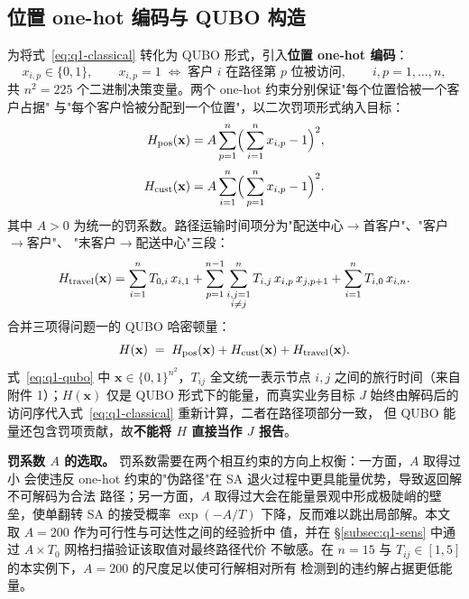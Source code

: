 \documentclass[UTF8,12pt,a4paper]{ctexart}
\begin{document}
\subsection{位置 one-hot 编码与 QUBO 构造}
\label{subsec:q1-qubo}

为将式~\eqref{eq:q1-classical} 转化为 QUBO 形式，引入\textbf{位置 one-hot 编码}：
\begin{equation}
x_{i,p}\in\{0,1\},\qquad x_{i,p}=1 \;\Longleftrightarrow\; \text{客户 } i \text{ 在路径第 } p \text{ 位被访问},\qquad i,p=1,\dots,n,
\end{equation}
共 $n^{2}=225$ 个二进制决策变量。两个 one-hot 约束分别保证"每个位置恰被一个客户占据"
与"每个客户恰被分配到一个位置"，以二次罚项形式纳入目标：
\begin{align}
H_{\rm pos}(\mathbf{x}) &= A\sum_{p=1}^{n}\!\Big(\sum_{i=1}^{n} x_{i,p}-1\Big)^{2},
   \label{eq:q1-pos}\\[2pt]
H_{\rm cust}(\mathbf{x}) &= A\sum_{i=1}^{n}\!\Big(\sum_{p=1}^{n} x_{i,p}-1\Big)^{2}.
   \label{eq:q1-cust}
\end{align}
其中 $A>0$ 为统一的罚系数。路径运输时间项分为"配送中心$\to$首客户"、"客户$\to$客户"、
"末客户$\to$配送中心"三段：
\begin{equation}
\label{eq:q1-travel}
H_{\rm travel}(\mathbf{x})
= \sum_{i=1}^{n} T_{0,i}\,x_{i,1}
+ \sum_{p=1}^{n-1}\sum_{\substack{i,j=1\\ i\ne j}}^{n} T_{i,j}\,x_{i,p}\,x_{j,p+1}
+ \sum_{i=1}^{n} T_{i,0}\,x_{i,n}.
\end{equation}
合并三项得问题一的 QUBO 哈密顿量：
\begin{equation}
\label{eq:q1-qubo}
H(\mathbf{x}) \;=\; H_{\rm pos}(\mathbf{x}) + H_{\rm cust}(\mathbf{x}) + H_{\rm travel}(\mathbf{x}).
\end{equation}
式~\eqref{eq:q1-qubo} 中 $\mathbf{x}\in\{0,1\}^{n^{2}}$，$T_{ij}$ 全文统一表示节点 $i,j$
之间的旅行时间（来自附件 1）；$H(\mathbf{x})$ 仅是 QUBO 形式下的能量，而真实业务目标
$J$ 始终由解码后的访问序代入式~\eqref{eq:q1-classical} 重新计算，二者在路径项部分一致，
但 QUBO 能量还包含罚项贡献，故\textbf{不能将 $H$ 直接当作 $J$ 报告}。

\textbf{罚系数 $A$ 的选取。} 罚系数需要在两个相互约束的方向上权衡：一方面，$A$ 取得过小
会使违反 one-hot 约束的"伪路径"在 SA 退火过程中更具能量优势，导致返回解不可解码为合法
路径；另一方面，$A$ 取得过大会在能量景观中形成极陡峭的壁垒，使单翻转 SA 的接受概率
$\exp(-A/T)$ 下降，反而难以跳出局部解。本文取 $A=200$ 作为可行性与可达性之间的经验折中
值，并在 §\ref{subsec:q1-sens} 中通过 $A\times T_{0}$ 网格扫描验证该取值对最终路径代价
不敏感。在 $n=15$ 与 $T_{ij}\in[1,5]$ 的本实例下，$A=200$ 的尺度足以使可行解相对所有
检测到的违约解占据更低能量。
\end{document}
